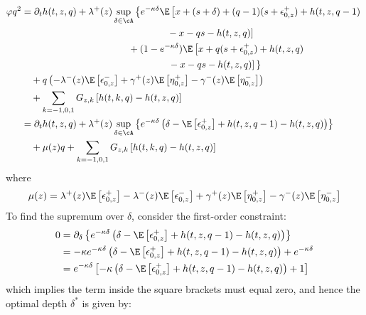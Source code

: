 \documentclass[12pt]{article}
\begin{document}
\begin{align*}
\varphi q^2 & = \partial_t h(t,z,q) + \lambda^+(z) \sup\limits_{\delta \in \cA} \left\lbrace  e^{ -\kappa \delta } \E \left[ x + (s + \delta) + (q-1)(s + \epsilon^+_{0,z}) + h(t,z,q-1) \right. \right. \\
&  \left. \hphantom{\partial_t h(t,z,q) + \lambda^+(z) \sup\limits_{\delta \in \cA} \left\lbrace  e^{ -\kappa \delta } \left( \E \right.\right.} - x - qs - h(t,z,q) \right] \\
& \hphantom{\partial_t h(t,z,q) + \lambda^+(z) \sup\limits_{\delta \in \cA} \left\lbrace \right.} + (1 - e^{-\kappa \delta}) \E \left[ x + q(s+\epsilon^+_{0,z}) + h(t,z,q) \right. \\
&  \left. \left. \hphantom{\partial_t h(t,z,q) + \lambda^+(z) \sup\limits_{\delta \in \cA} \left\lbrace  e^{ -\kappa \delta } \left( \E \right.\right.} - x - qs - h(t,z,q) \right] \, \right\rbrace \\
& \quad + q \left( -\lambda^-(z) \E \left[ \epsilon^-_{0,z} \right] + \gamma^+(z)  \E \left[ \eta^+_{0,z} \right] - \gamma^-(z) \E \left[ \eta^-_{0,z} \right] \right) \\
& \quad + \sum_{k=-1,0,1} G_{z,k} \left[ h(t,k,q) - h(t,z,q) \right] \\
& = \partial_t h(t,z,q) + \lambda^+(z) \sup\limits_{\delta \in \cA} \left\lbrace  e^{ -\kappa \delta } \left( \delta - \E \left[ \epsilon^+_{0,z} \right] + h(t,z,q-1) - h(t,z,q) \right) \right\rbrace \\
& \quad + \mu(z) q + \sum_{k=-1,0,1} G_{z,k} \left[ h(t,k,q) - h(t,z,q) \right]
\end{align*}
where
\[ \mu(z) =  \lambda^+(z) \E \left[ \epsilon^+_{0,z} \right] - \lambda^-(z) \E \left[ \epsilon^-_{0,z} \right] + \gamma^+(z)  \E \left[ \eta^+_{0,z} \right] - \gamma^-(z) \E \left[ \eta^-_{0,z} \right] \]
To find the supremum over $\delta$, consider the first-order constraint:
\begin{align*}
0 & = \partial_\delta \left\lbrace  e^{ -\kappa \delta } \left( \delta - \E \left[ \epsilon^+_{0,z} \right] + h(t,z,q-1) - h(t,z,q) \right) \right\rbrace \\
& = -\kappa e^{ -\kappa \delta } \left( \delta - \E \left[ \epsilon^+_{0,z} \right] + h(t,z,q-1) - h(t,z,q) \right) + e^{ -\kappa \delta } \\
& =  e^{ -\kappa \delta } \left[ -\kappa \left( \delta - \E \left[ \epsilon^+_{0,z} \right] + h(t,z,q-1) - h(t,z,q) \right) + 1 \right]
\end{align*}
which implies the term inside the square brackets must equal zero, and hence the optimal depth $\delta^*$ is given by:
\end{document}
